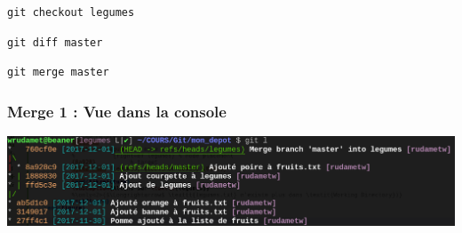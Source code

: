 \documentclass[table,tikz,12pt,svgnames]{beamer}
\begin{document}
\begin{frame}[fragile]
\vspace{0.4cm} \begin{center} \noindent{} \end{center} \vspace{-0.4cm}
\begin{verbatim}
git checkout legumes
\end{verbatim}
\pause[2]
\begin{verbatim}
git diff master
\end{verbatim}
\pause[3]
\begin{verbatim}
git merge master
\end{verbatim}
\end{frame}

\begin{frame}
\frametitle{Merge 1 : Vue dans la console}
\begin{adjustwidth}{-0.8cm}{}
	\begin{center}
		{\includegraphics[scale=0.3]{images/git_log_merge.png}}
	\end{center}
\end{adjustwidth}
\end{frame}
\end{document}
